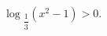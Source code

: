 \begin{ex}[type=inequality]
	\begin{condition}
		$ \log$\tiny$_{\dfrac{1}{3}}$\normalsize$(x^2 - 1)>0 .$
	\end{condition}
\end{ex}